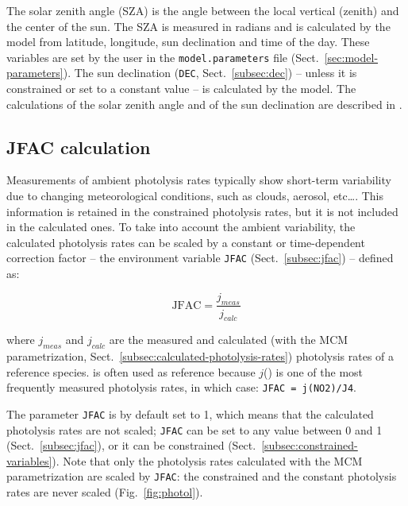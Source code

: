 The solar zenith angle (SZA) is the angle between the local vertical
(zenith) and the center of the sun. The SZA is measured in radians and
is calculated by the model from latitude, longitude, sun declination
and time of the day. These variables are set by the user in the
\texttt{model.parameters} file (Sect.~\ref{sec:model-parameters}). The
sun declination (\texttt{DEC}, Sect.~\ref{subsec:dec}) -- unless it is
constrained or set to a constant value -- is calculated by the
model. The calculations of the solar zenith angle and of the sun
declination are described in \citet{madronich_1993}.

\subsection{JFAC calculation} \label{subsec:jfac-calculation}

Measurements of ambient photolysis rates typically show short-term
variability due to changing meteorological conditions, such as clouds,
aerosol, etc\ldots \citep{sommariva_2020}. This information is
retained in the constrained photolysis rates, but it is not included
in the calculated ones. To take into account the ambient variability,
the calculated photolysis rates can be scaled by a constant or
time-dependent correction factor -- the environment variable
\texttt{JFAC} (Sect.~\ref{subsec:jfac}) -- defined as:

\begin{equation}
  \mathrm{JFAC} = \frac{j_{meas}}{j_{calc}}
\end{equation}

where $j_{meas}$ and $j_{calc}$ are the measured and calculated (with
the MCM parametrization, Sect.~\ref{subsec:calculated-photolysis-rates})
photolysis rates of a reference species.  is often used as
reference because $j$() is one of the most frequently measured
photolysis rates, in which case: \verb|JFAC = j(NO2)/J4|.

The parameter \texttt{JFAC} is by default set to 1, which means that
the calculated photolysis rates are not scaled; \texttt{JFAC} can be
set to any value between 0 and 1 (Sect.~\ref{subsec:jfac}), or it can
be constrained (Sect.~\ref{subsec:constrained-variables}). Note that
only the photolysis rates calculated with the MCM parametrization are
scaled by \texttt{JFAC}: the constrained and the constant photolysis
rates are never scaled (Fig.~\ref{fig:photol}).

